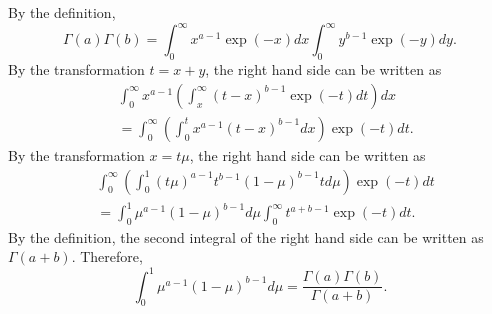 \subsection{}
\label{2.5}
By the definition,
%
\begin{equation}
\Gamma (a) \Gamma (b) = \int_{0}^{\infty} x ^ {a - 1} \exp (- x) dx \int_{0}^{\infty} y ^ {b - 1} \exp (- y) dy.
\end{equation}
%
By the transformation $t = x + y$, the right hand side can be written as
%
\begin{equation}
\begin{aligned}
&\int_{0}^{\infty} x ^ {a - 1} \left( \int_{x}^{\infty} (t - x) ^ {b - 1} \exp (- t) dt \right) dx \\
&=  \int_{0}^{\infty} \left( \int_{0}^{t} x ^ {a - 1} (t - x) ^ {b - 1} dx \right) \exp (- t) dt.
\end{aligned}
\end{equation}
%
By the transformation $x = t \mu$, the right hand side can be written as
%
\begin{equation}
\begin{aligned}
&\int_{0}^{\infty} \left( \int_{0}^{1} (t \mu) ^ {a - 1} t ^ {b - 1} (1 - \mu) ^ {b - 1} t d\mu \right) \exp (- t) dt \\
&= \int_{0}^{1} \mu ^ {a - 1} (1 - \mu) ^ {b - 1} d\mu \int_{0}^{\infty} t ^ {a + b - 1} \exp ( - t ) dt.
\end{aligned}
\end{equation}
%
By the definition, the second integral of the right hand side  can be written as $\Gamma(a + b)$.
%
Therefore,
%
\begin{equation}
\int_{0}^{1} \mu ^ {a - 1} (1 - \mu) ^ {b - 1} d\mu = \frac{\Gamma (a) \Gamma (b)}{\Gamma (a + b)}.
\end{equation}
%















